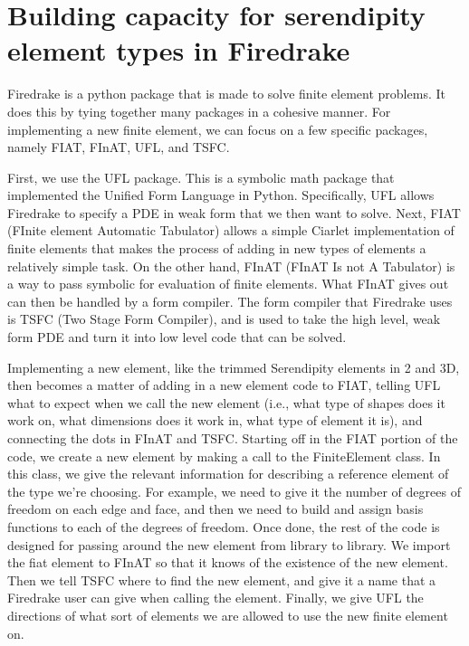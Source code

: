 \documentclass[manuscript,screen]{acmart}
\begin{document}
  \section{Building capacity for serendipity element types in Firedrake}
  
  Firedrake is a python package that is made to solve finite element problems.  It does this by tying together many packages in a cohesive manner.  For implementing a new finite element, we can focus on a few specific packages, namely FIAT, FInAT, UFL, and TSFC.  
  
  \noindent First, we use the UFL package.  This is a symbolic math package that implemented the Unified Form Language in Python.  Specifically, UFL allows Firedrake to specify a PDE in weak form that we then want to solve.  Next, FIAT (FInite element Automatic Tabulator) allows a simple Ciarlet implementation of finite elements that makes the process of adding in new types of elements a relatively simple task.  On the other hand, FInAT (FInAT Is not A Tabulator) is a way to pass symbolic for evaluation of finite elements.  What FInAT gives out can then be handled by a form compiler.  The form compiler that Firedrake uses is TSFC (Two Stage Form Compiler), and is used to take the high level, weak form PDE and turn it into low level code that can be solved.  
  
  \noindent Implementing a new element, like the trimmed Serendipity elements in 2 and 3D, then becomes a matter of adding in a new element code to FIAT, telling UFL what to expect when we call the new element (i.e., what type of shapes does it work on, what dimensions does it work in, what type of element it is), and connecting the dots in FInAT and TSFC.  Starting off in the FIAT portion of the code, we create a new element by making a call to the FiniteElement class.  In this class, we give the relevant information for describing a reference element of the type we're choosing.  For example, we need to give it the number of degrees of freedom on each edge and face, and then we need to build and assign basis functions to each of the degrees of freedom.   Once done, the rest of the code is designed for passing around the new element from library to library.  We import the fiat element to FInAT so that it knows of the existence of the new element.  Then we tell TSFC where to find the new element, and give it a name that a Firedrake user can give when calling the element.  Finally, we give UFL the directions of what sort of elements we are allowed to use the new finite element on.    
  
\end{document}
